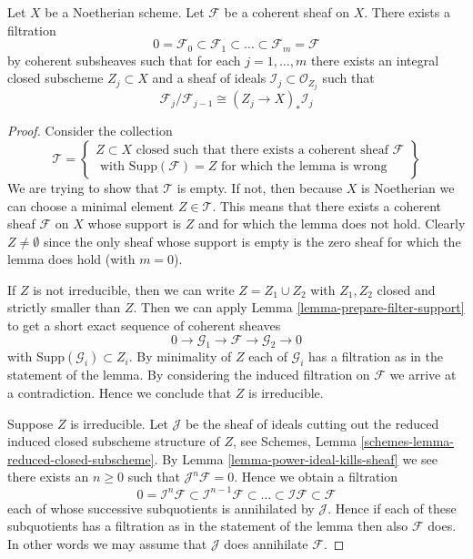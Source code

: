 \begin{lemma}
\label{lemma-coherent-filter}
Let $X$ be a Noetherian scheme.
Let $\mathcal{F}$ be a coherent sheaf on $X$.
There exists a filtration
$$
0 = \mathcal{F}_0 \subset \mathcal{F}_1 \subset
\ldots \subset \mathcal{F}_m = \mathcal{F}
$$
by coherent subsheaves such that for each $j = 1, \ldots, m$
there exists an integral closed subscheme $Z_j \subset X$
and a sheaf of ideals $\mathcal{I}_j \subset \mathcal{O}_{Z_j}$
such that
$$
\mathcal{F}_j/\mathcal{F}_{j - 1}
\cong (Z_j \to X)_* \mathcal{I}_j
$$
\end{lemma}

\begin{proof}
Consider the collection
$$
\mathcal{T} =
\left\{
\begin{matrix}
Z \subset X
\text{ closed such that there exists a coherent sheaf }
\mathcal{F} \\
\text{ with }
\text{Supp}(\mathcal{F}) = Z
\text{ for which the lemma is wrong}
\end{matrix}
\right\}
$$
We are trying to show that $\mathcal{T}$ is empty. If not, then
because $X$ is Noetherian we can choose a minimal element
$Z \in \mathcal{T}$. This means that there exists a coherent
sheaf $\mathcal{F}$ on $X$ whose support is $Z$ and for which the
lemma does not hold. Clearly $Z \not = \emptyset$ since the only
sheaf whose support is empty is the zero sheaf for which the
lemma does hold (with $m = 0$).

\medskip\noindent
If $Z$ is not irreducible, then we can write $Z = Z_1 \cup Z_2$
with $Z_1, Z_2$ closed and strictly smaller than $Z$.
Then we can apply Lemma \ref{lemma-prepare-filter-support}
to get a short exact sequence of coherent sheaves
$$
0 \to
\mathcal{G}_1 \to
\mathcal{F} \to
\mathcal{G}_2 \to 0
$$
with $\text{Supp}(\mathcal{G}_i) \subset Z_i$. By minimality of
$Z$ each of $\mathcal{G}_i$ has a filtration as in the statement
of the lemma. By considering the induced filtration on $\mathcal{F}$
we arrive at a contradiction. Hence we conclude
that $Z$ is irreducible.

\medskip\noindent
Suppose $Z$ is irreducible. Let $\mathcal{J}$ be the sheaf of ideals
cutting out the reduced induced closed subscheme structure of $Z$,
see Schemes, Lemma \ref{schemes-lemma-reduced-closed-subscheme}.
By Lemma \ref{lemma-power-ideal-kills-sheaf} we see there exists
an $n \geq 0$ such that $\mathcal{J}^n\mathcal{F} = 0$. Hence we obtain
a filtration
$$
0 = \mathcal{I}^n\mathcal{F} \subset \mathcal{I}^{n - 1}\mathcal{F}
\subset \ldots \subset \mathcal{I}\mathcal{F} \subset \mathcal{F}
$$
each of whose successive subquotients is annihilated by $\mathcal{J}$.
Hence if each of these subquotients has a filtration as in the statement
of the lemma then also $\mathcal{F}$ does. In other words we may
assume that $\mathcal{J}$ does annihilate $\mathcal{F}$.


\end{proof}
